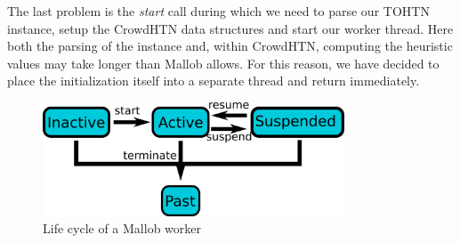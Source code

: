 The last problem is the \textit{start} call during which we need to parse our TOHTN instance, setup the CrowdHTN data structures and start our worker thread. Here both the parsing of the instance and, within CrowdHTN, computing the heuristic values may take longer than Mallob allows. For this reason, we have decided to place the initialization itself into a separate thread and return immediately.
\begin{figure}
	\caption{Life cycle of a Mallob worker}
	\label{figure: mallob state diagram}
	\centering
	\includegraphics[width=0.8\textwidth]{images/final/mallob_state}
\end{figure}

